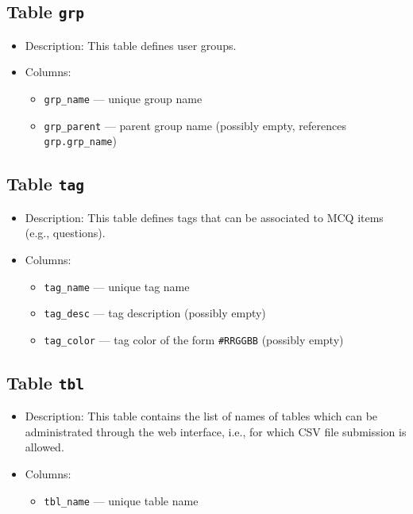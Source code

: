 \subsection{Table \texttt{grp}}
\begin{itemize}[itemsep=0pt,parsep=0pt,topsep=0pt,partopsep=0pt]
\item Description: This table defines user groups.
\item Columns:
\begin{itemize}[itemsep=0pt,parsep=0pt,topsep=0pt,partopsep=0pt]
\item\texttt{grp\_name} --- unique group name
\item\texttt{grp\_parent} --- parent group name (possibly empty, references {\tt
           grp.grp\_name})
\end{itemize}
\end{itemize}
\subsection{Table \texttt{tag}}
\begin{itemize}[itemsep=0pt,parsep=0pt,topsep=0pt,partopsep=0pt]
\item Description: This table defines tags that can be associated to MCQ
           items (e.g., questions).
\item Columns:
\begin{itemize}[itemsep=0pt,parsep=0pt,topsep=0pt,partopsep=0pt]
\item\texttt{tag\_name} --- unique tag name
\item\texttt{tag\_desc} --- tag description (possibly empty)
\item\texttt{tag\_color} --- tag color of the form \verb+#RRGGBB+ (possibly empty)
\end{itemize}
\end{itemize}
\subsection{Table \texttt{tbl}}
\begin{itemize}[itemsep=0pt,parsep=0pt,topsep=0pt,partopsep=0pt]
\item Description: This table contains the list of names of tables
           which can be administrated through the web interface, i.e.,
           for which CSV file submission is allowed.
\item Columns:
\begin{itemize}[itemsep=0pt,parsep=0pt,topsep=0pt,partopsep=0pt]
\item\texttt{tbl\_name} --- unique table name
\end{itemize}
\end{itemize}
